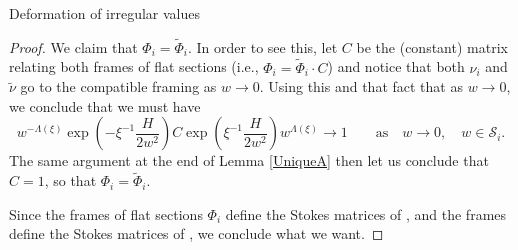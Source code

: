\begin{subsubsection}{Deformation of irregular values}
\begin{proof}
We claim that $\Phi_i=\widetilde{\Phi}_i$. In order to see this, let $C$ be the (constant) matrix relating both frames of flat sections (i.e., $\Phi_i=\widetilde{\Phi}_i \cdot C$) and notice that both $\nu_i$ and $\widetilde{\nu}$ go to the compatible framing  as $w\to 0$. Using this and that fact that  as $w\to 0$, we conclude that we must have{\samepage
\begin{equation*}
 w^{-\Lambda(\xi)}\exp \left(-\xi^{-1}\frac{H}{2w^2}\right)C\exp \left(\xi^{-1}\frac{H}{2w^2}\right)w^{\Lambda(\xi)} \to 1\qquad \text{as} \quad w\to 0,\quad w\in \mathcal{S}_i.
\end{equation*}
The same argument at the end of Lemma \ref{UniqueA} then let us conclude that $C=1$, so that $\Phi_i=\widetilde{\Phi}_i$.}

Since the frames of flat sections $\Phi_i$ define the Stokes matrices of , and the frames  define the Stokes matrices of , we conclude what we want.
\end{proof}
\end{subsubsection}

